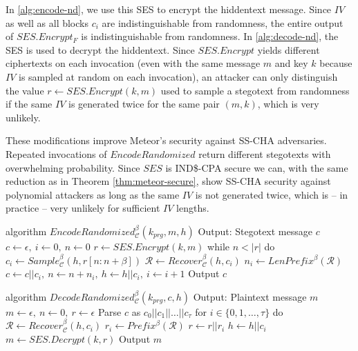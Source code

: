 In \autoref{alg:encode-nd}, we use this SES to encrypt the hiddentext message.
Since $IV$ as well as all blocks $c_i$ are indistinguishable from randomness, the entire output of $SES.Encrypt_F$ is indistinguishable from randomness.
In \autoref{alg:decode-nd}, the SES is used to decrypt the hiddentext.
Since $SES.Encrypt$ yields different ciphertexts on each invocation (even with the same message $m$ and key $k$ because $IV$ is sampled at random on each invocation), an attacker can only distinguish the value $r \leftarrow SES.Encrypt(k,m)$ used to sample a stegotext from randomness if the same $IV$ is generated twice for the same pair $(m,k)$, which is very unlikely.

These modifications improve Meteor's security against SS-CHA adversaries.
Repeated invocations of $EncodeRandomized$ return different stegotexts with overwhelming probability.
Since $SES$ is IND\$-CPA secure we can, with the same reduction as in Theorem \ref{thm:meteor-secure}, show SS-CHA security against polynomial attackers as long as the same $IV$ is not generated twice, which is -- in practice -- very unlikely for sufficient $IV$ lengths.


\begin{Pseudocode}[float, caption={
$EncodeRandomized$ algorithm.
This algorithm differs from the original $Encode$ algorithm by using $SES$ to encrypt the message.
The ciphertext (which is indistinguishable from randomness and indeterministic) is then used to sample from $\mathcal{C}_h$.
}, label={alg:encode-nd}]
algorithm $EncodeRandomized_{\mathcal{C}}^{\beta}(k_{prg}, m, h)$
  Output: Stegotext message $c$
  $c \leftarrow \epsilon,~ i \leftarrow 0,~ n \leftarrow 0$
  $r \leftarrow SES.Encrypt(k, m)$
  while $n < |r|$ do
    $c_i \leftarrow Sample_{\mathcal{C}}^\beta(h, r[n: n+\beta])$
    $\mathcal{R} \leftarrow Recover_{\mathcal{C}}^\beta(h, c_i)$
    $n_i \leftarrow LenPrefix^\beta(\mathcal{R})$
    $c \leftarrow c || c_i,~ n \leftarrow n+n_i,~ h \leftarrow h||c_i,~ i \leftarrow i + 1$
  Output $c$
\end{Pseudocode}
\begin{Pseudocode}[float, caption={
$DecodeRandomized$ algorithm.
This algorithm differs from the original $Decode$ algorithm by using $SES$ to decrypt the stegotext.
}, label={alg:decode-nd}]
algorithm $DecodeRandomized_{\mathcal{C}}^{\beta}(k_{prg}, c, h)$
  Output: Plaintext message $m$
  $m \leftarrow \epsilon,~ n \leftarrow 0,~ r \leftarrow \epsilon$
  Parse $c$ as $c_0 || c_1 || \dots || c_{\tau}$
  for $i \in \{ 0, 1, \dots, \tau \}$ do
    $\mathcal{R} \leftarrow Recover_{\mathcal{C}}^\beta(h, c_i)$
    $r_i \leftarrow Prefix^\beta(\mathcal{R})$
    $r \leftarrow r || r_i$
    $h \leftarrow h||c_i$
  $m \leftarrow SES.Decrypt(k, r)$
  Output $m$
\end{Pseudocode}